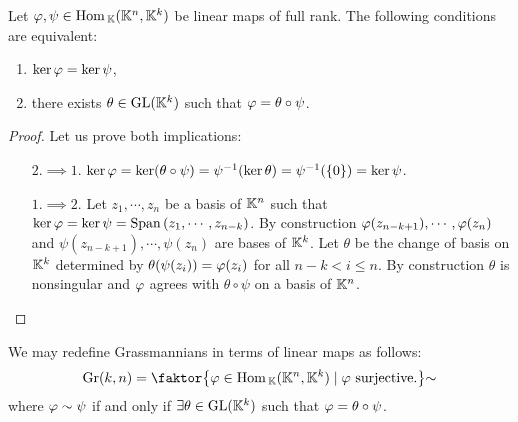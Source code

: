\begin{lemma}\label{kerAkerBVSActionOfGLk}
Let $\varphi,\psi\in \mathrm{Hom}\,_{\mathbb{K}}(\mathbb{K}^n,\mathbb{K}^k)$ be linear maps of full rank. The following conditions are equivalent:
\begin{enumerate}
    \item $\ker\varphi=\ker\psi$,
    \item there exists $\theta\in \mathrm{GL}(\mathbb{K}^k)$ such that $\varphi=\theta\circ \psi$. 
\end{enumerate}
\end{lemma}
\begin{proof}
Let us prove both implications:
\setlength{\leftmargini}{0cm}
\begin{itemize}
\item[$\boxed{2.\implies 1.}$] $\ker \varphi=\ker(\theta\circ \psi)=\psi^{-1}(\ker \theta)=\psi^{-1}(\left\{{0}\right\})=\ker \psi$. 
\item[$\boxed{1.\implies 2.}$] Let $z_1,\cdots, z_n$ be a basis of $\mathbb{K}^n$ such that $\ker\varphi=\ker\psi=\mathrm{Span}\,(z_1,\cdots, z_{n-k})$. By construction $\varphi(z_{n-k+1}),\cdots, \varphi(z_n)$ and $\psi(z_{n-k+1}),\cdots, \psi(z_n)$ are bases of $\mathbb{K}^k$. 
Let $\theta$ be the change of basis on $\mathbb{K}^k$ determined by $\theta(\psi(z_i))=\varphi(z_i)$ for all $n-k<i\leq n$. By construction $\theta$ is nonsingular and $\varphi$ agrees with $\theta\circ \psi$ on a basis of $\mathbb{K}^n$.
\end{itemize}
\setlength{\leftmargini}{0.5cm}
\end{proof}

\begin{corollary}\label{LinearQuotientDefinition}
We may redefine Grassmannians in terms of linear maps as follows:
\[\Gr(k,n)=\quot{\cpa{\vp\in \Hom_\K(\K^n,\K^k)\mid \vp\ \text{surjective.}}}\sim\]
where $\varphi\sim \psi$ if and only if $\exists \theta\in \mathrm{GL}(\mathbb{K}^k)$ such that $\varphi=\theta\circ \psi$.
\end{corollary}
\bigskip

